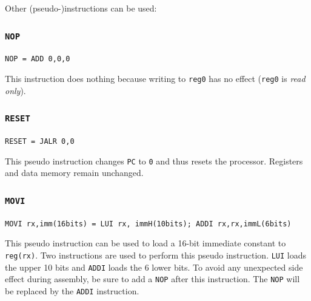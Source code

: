\documentclass[10pt,a4paper]{article}
\theoremstyle{definition}%
\newcommand{\reg}[1]{\texttt{reg#1}}
\begin{document}
Other (pseudo-)instructions can be used:
\subsubsection{\texttt{NOP}}
\verb!NOP = ADD 0,0,0!

This instruction does nothing because writing to \reg{0} has no effect (\reg{0} is \textit{read only}).

\subsubsection{\texttt{RESET}}
\verb!RESET = JALR 0,0!

This pseudo instruction changes \verb!PC! to \verb!0! and thus resets the processor. Registers and data memory remain unchanged.

\subsubsection{\texttt{MOVI}}
\verb!MOVI rx,imm(16bits) = LUI rx, immH(10bits); ADDI rx,rx,immL(6bits)!

This pseudo instruction can be used to load a 16-bit immediate constant to \reg{(rx)}. Two instructions are used to perform this pseudo instruction. \verb!LUI! loads the upper 10 bits and \verb!ADDI! loads the 6 lower bits. To avoid any unexpected side effect during assembly, be sure to add a \verb!NOP! after this instruction. The \verb!NOP! will be replaced by the \verb!ADDI! instruction.
\end{document}
